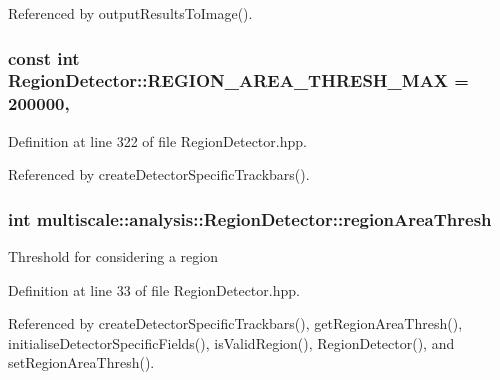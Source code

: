 Referenced by output\-Results\-To\-Image().

\hypertarget{classmultiscale_1_1analysis_1_1RegionDetector_a8a301bd841d376448aff4a0c4d0a1485}{
\subsubsection[{R\-E\-G\-I\-O\-N\-\_\-\-A\-R\-E\-A\-\_\-\-T\-H\-R\-E\-S\-H\-\_\-\-M\-A\-X}]{\setlength{\rightskip}{0pt plus 5cm}const int Region\-Detector\-::\-R\-E\-G\-I\-O\-N\-\_\-\-A\-R\-E\-A\-\_\-\-T\-H\-R\-E\-S\-H\-\_\-\-M\-A\-X = 200000\hspace{0.3cm}{\ttfamily [static]}, {\ttfamily [private]}}}\label{classmultiscale_1_1analysis_1_1RegionDetector_a8a301bd841d376448aff4a0c4d0a1485}


Definition at line 322 of file Region\-Detector.\-hpp.



Referenced by create\-Detector\-Specific\-Trackbars().

\hypertarget{classmultiscale_1_1analysis_1_1RegionDetector_a1f637073a3d946d000dceed01412f19a}{
\subsubsection[{region\-Area\-Thresh}]{\setlength{\rightskip}{0pt plus 5cm}int multiscale\-::analysis\-::\-Region\-Detector\-::region\-Area\-Thresh\hspace{0.3cm}{\ttfamily [private]}}}\label{classmultiscale_1_1analysis_1_1RegionDetector_a1f637073a3d946d000dceed01412f19a}
Threshold for considering a region 

Definition at line 33 of file Region\-Detector.\-hpp.



Referenced by create\-Detector\-Specific\-Trackbars(), get\-Region\-Area\-Thresh(), initialise\-Detector\-Specific\-Fields(), is\-Valid\-Region(), Region\-Detector(), and set\-Region\-Area\-Thresh().

